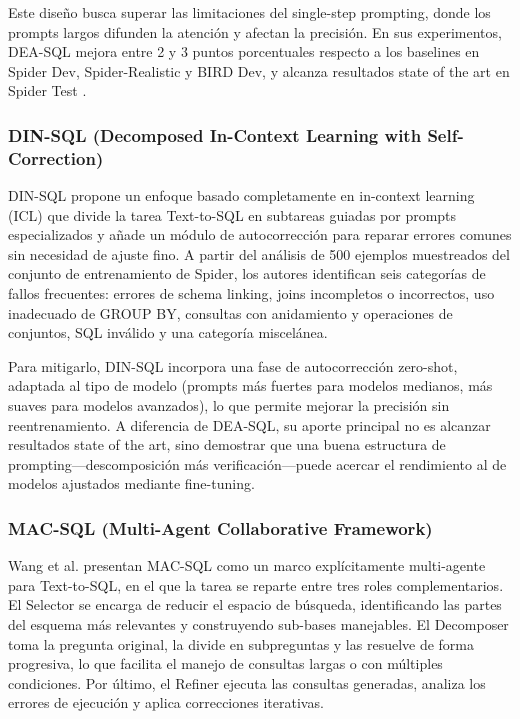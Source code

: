 \documentclass[journal]{IEEEtran}
\begin{document}
Este diseño busca superar las limitaciones del single-step prompting, donde los prompts largos difunden la atención y afectan la precisión. En sus experimentos, DEA-SQL mejora entre 2 y 3 puntos porcentuales respecto a los baselines en Spider Dev, Spider-Realistic y BIRD Dev, y alcanza resultados state of the art en Spider Test \cite{xie2024dea}.

\subsubsection{DIN-SQL (Decomposed In-Context Learning with Self-Correction)}

DIN-SQL \cite{pourreza2023din} propone un enfoque basado completamente en in-context learning (ICL) que divide la tarea Text-to-SQL en subtareas guiadas por prompts especializados y añade un módulo de autocorrección para reparar errores comunes sin necesidad de ajuste fino. A partir del análisis de 500 ejemplos muestreados del conjunto de entrenamiento de Spider, los autores identifican seis categorías de fallos frecuentes: errores de schema linking, joins incompletos o incorrectos, uso inadecuado de GROUP BY, consultas con anidamiento y operaciones de conjuntos, SQL inválido y una categoría miscelánea.

Para mitigarlo, DIN-SQL incorpora una fase de autocorrección zero-shot, adaptada al tipo de modelo (prompts más fuertes para modelos medianos, más suaves para modelos avanzados), lo que permite mejorar la precisión sin reentrenamiento. A diferencia de DEA-SQL, su aporte principal no es alcanzar resultados state of the art, sino demostrar que una buena estructura de prompting—descomposición más verificación—puede acercar el rendimiento al de modelos ajustados mediante fine-tuning.

\subsubsection{MAC-SQL (Multi-Agent Collaborative Framework)}

Wang et al. \cite{wang2025mac} presentan MAC-SQL como un marco explícitamente multi-agente para Text-to-SQL, en el que la tarea se reparte entre tres roles complementarios. El Selector se encarga de reducir el espacio de búsqueda, identificando las partes del esquema más relevantes y construyendo sub-bases manejables. El Decomposer toma la pregunta original, la divide en subpreguntas y las resuelve de forma progresiva, lo que facilita el manejo de consultas largas o con múltiples condiciones. Por último, el Refiner ejecuta las consultas generadas, analiza los errores de ejecución y aplica correcciones iterativas.
\end{document}
